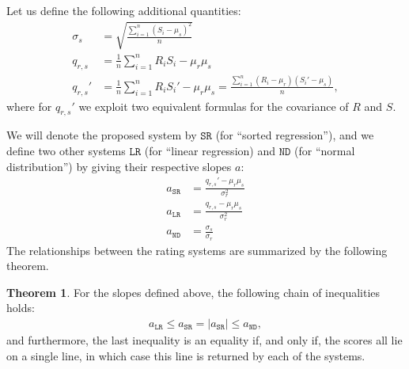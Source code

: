 \documentclass{article}
\newcommand{\artg}{\mu_r}
\newcommand{\ascr}{\mu_s}
\newcommand{\vrtg}{\sigma_r}
\newcommand{\vscr}{\sigma_s}
\newcommand{\cov}{q_{r,s}}
\newcommand{\SR}{\texttt{SR}}
\newcommand{\LR}{\texttt{LR}}
\newcommand{\ND}{\texttt{ND}}
\theoremstyle{definition}
\newtheorem*{theorem}{Theorem}
\begin{document}
\noindent
Let us define the following additional quantities:
\begin{align*}
\vscr&=\sqrt{\frac{\sum_{i=1}^n (S_i - \ascr)^2}{n}}\\
\cov&=\frac{1}{n}\sum_{i=1}^n R_iS_i -\artg\ascr\\
\cov'&=\frac{1}{n}\sum_{i=1}^n R_iS_i' -\artg\ascr=\frac{\sum_{i=1}^n (R_i - \artg)(S_i' - \ascr)}{n},
\end{align*}
where for $\cov'$ we exploit two equivalent formulas for the covariance of $R$ and $S$.

We will denote the proposed system by $\SR$ (for ``sorted regression''), and we define two other systems $\LR$ (for ``linear regression) and $\ND$ (for ``normal distribution'') by giving their respective slopes $a$:
\begin{align}
a_\SR&=\frac{\cov'-\artg\ascr}{\vrtg^2}\\
a_\LR&=\frac{\cov-\artg\ascr}{\vrtg^2}\\
a_\ND&=\frac{\vscr}{\vrtg}
\end{align}
The relationships between the rating systems are summarized by the following theorem.
\begin{theorem}\label{thm:chain} For the slopes defined above, the following chain of inequalities holds:
\begin{align}\label{eq:thm}
a_\LR\leq a_\SR=|a_\SR|\leq a_\ND,
\end{align}
and furthermore, the last inequality is an equality if, and only if, the scores all lie on a single line, in which case this line is returned by each of the systems.
\end{theorem}
\end{document}
